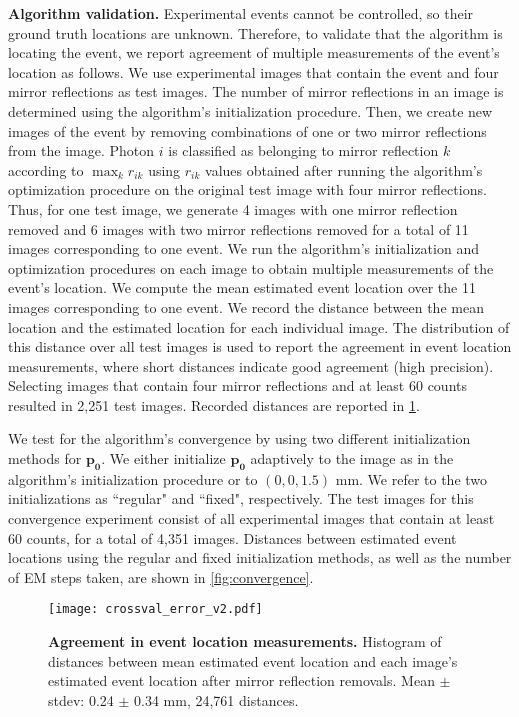 \noindent
\textbf{Algorithm validation.}
Experimental events cannot be controlled, so their ground truth locations are unknown.
Therefore, to validate that the algorithm is locating the event, we report 
agreement of multiple measurements of the event's location as follows.
We use experimental images that contain the event and four mirror reflections as 
test images.
The number of mirror reflections in an image is determined using the algorithm's 
initialization procedure.
Then, we create new images of the event by removing combinations of one or two 
mirror reflections from the image.
Photon $i$ is classified as belonging to mirror reflection $k$ according to 
$\max_k r_{ik}$ using $r_{ik}$ values obtained after running the algorithm's 
optimization procedure on the original test image with four mirror reflections.
Thus, for one test image, we generate 4 images with one mirror reflection removed 
and 6 images with two mirror reflections removed for a total of 11 images 
corresponding to one event.
We run the algorithm's initialization and optimization procedures on each image to 
obtain multiple measurements of the event's location.
We compute the mean estimated event location over the 11 images corresponding to 
one event.
We record the distance between the mean location and the estimated location for 
each individual image.
The distribution of this distance over all test images is used to report the 
agreement in event location measurements, where short distances indicate good 
agreement (high precision).
Selecting images that contain four mirror reflections and at least 60 counts 
resulted in 2,251 test images.
Recorded distances are reported in \cref{fig:crossval_error}.

We test for the algorithm's convergence by using two different initialization 
methods for $\bm{p_0}$. 
We either initialize $\bm{p_0}$ adaptively to the image as in the algorithm's 
initialization procedure or to $(0,0,1.5)$ mm.
We refer to the two initializations as ``regular" and ``fixed", respectively.
The test images for this convergence experiment consist of all experimental images 
that contain at least 60 counts, for a total of 4,351 images.
Distances between estimated event locations using the regular and fixed 
initialization methods, as well as the number of EM steps taken, are shown in \cref{fig:convergence}.

\begin{figure}
\centering
\texttt{[image: crossval\_error\_v2.pdf]}
\caption{\textbf{Agreement in event location measurements.} Histogram of distances 
between mean estimated event location and each image's estimated event location 
after mirror reflection removals. Mean $\pm$ stdev: 0.24 $\pm$ 0.34 mm, 24,761 distances.
} 
\label{fig:crossval_error}
\end{figure}

